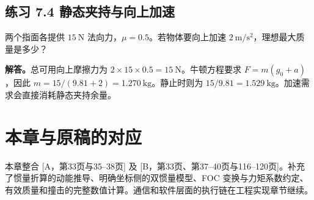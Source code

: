 \subsection*{练习 7.4 静态夹持与向上加速}
两个指面各提供 $15\ \mathrm N$ 法向力，$\mu=0.5$。若物体要向上加速 $2\ \mathrm{m/s^2}$，理想最大质量是多少？

\textbf{解答。}总可用向上摩擦力为 $2\times15\times0.5=15\ \mathrm N$。牛顿方程要求 $F=m(g_0+a)$，因此 $m=15/(9.81+2)=1.270\ \mathrm{kg}$。静止时则为 $15/9.81=1.529\ \mathrm{kg}$。加速需求会直接消耗静态夹持余量。

\section*{本章与原稿的对应}
本章整合 [A，第33页与35--38页] 及 [B，第33页、第37--40页与116--120页]。补充了惯量折算的动能推导、明确坐标侧的双惯量模型、FOC 变换与力矩系数约定、有效质量和撞击的完整数值计算。通信和软件层面的执行链在工程实现章节继续。
